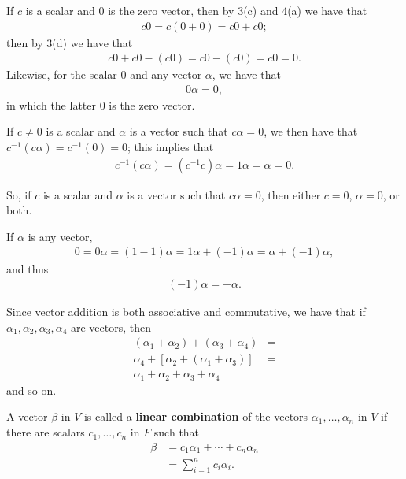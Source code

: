\documentclass[12pt]{article}
\begin{document}
\begin{comm}
  If $c$ is a scalar and $0$ is the zero vector, then by 3(c) and
  4(a) we have that
  \begin{align*}
    c0 = c(0 + 0) = c0 + c0;
  \end{align*}
  then by 3(d) we have that
  \begin{align*}
    c0 + c0 - (c0) = c0 - (c0) = c0 = 0.
  \end{align*}
  Likewise, for the scalar $0$ and any vector $\alpha$, we have
  that
  \begin{align*}
    0\alpha = 0,
  \end{align*}
  in which the latter $0$ is the zero vector.

  If $c \neq 0$ is a scalar and $\alpha$ is a vector such that
  $c\alpha = 0$, we then have that $c^{-1}(c\alpha) = c^{-1}(0) =
  0$; this implies that
  \begin{align*}
    c^{-1}(c\alpha) = (c^{-1}c)\alpha = 1\alpha = \alpha = 0.
  \end{align*}

  So, if $c$ is a scalar and $\alpha$ is a vector such that
  $c\alpha = 0$, then either $c = 0$, $\alpha = 0$, or both.
\end{comm}

\begin{comm}
  If $\alpha$ is any vector,
  \begin{align*}
    0 = 0\alpha = (1 - 1)\alpha = 1\alpha + (-1)\alpha = \alpha +
    (-1)\alpha,
  \end{align*}
  and thus
  \begin{align*}
    (-1)\alpha = -\alpha.
  \end{align*}
\end{comm}

\begin{comm}
  Since vector addition is both associative and commutative, we
  have that if $\alpha_1,\alpha_2,\alpha_3,\alpha_4$ are vectors,
  then
  \begin{align*}
    (\alpha_1 + \alpha_2) + (\alpha_3 + \alpha_4) &=\\
    \alpha_4 + [\alpha_2 + (\alpha_1 + \alpha_3)] &=\\
    \alpha_1 + \alpha_2 + \alpha_3 + \alpha_4&
  \end{align*}
  and so on.
\end{comm}

\begin{defn}
  A vector $\beta$ in $V$ is called a \textbf{linear combination}
  of the vectors $\alpha_1,\ldots,\alpha_n$ in $V$ if there are
  scalars $c_1,\ldots,c_n$ in $F$ such that
  \begin{align*}
    \beta &= c_1\alpha_1 + \cdots + c_n\alpha_n\\
          &= \sum_{i = 1}^{n}c_i\alpha_i.
  \end{align*}
\end{defn}
\end{document}
